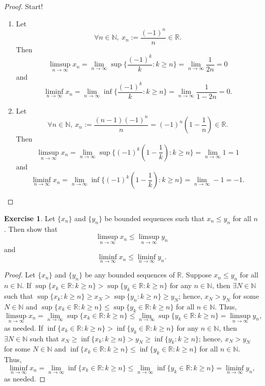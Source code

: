 \documentclass[12pt]{article}
\theoremstyle{definition}
\newtheorem{exercise}{Exercise}
\begin{document}
\begin{proof}
    Start!
    \begin{enumerate}[label=\alph*)]
        \item Let
        \[
            \forall n \in \mathbb{N}, \ x_n := \frac{(-1)^n}{n} \in \mathbb{R}.
        \]
        Then
        \[
            \limsup_{n \to \infty}x_n = \lim_{n \to \infty}\sup\bigg\{\frac{(-1)^k}{k} : k \geq n\bigg\} = \lim_{n \to \infty}\frac{1}{2n} = 0
        \]
        and 
        \[
            \liminf_{n \to \infty}x_n = \lim_{n \to \infty}\inf\bigg\{\frac{(-1)^k}{k} : k \geq n\bigg\} = \lim_{n \to \infty}\frac{1}{1 - 2n} =  0.
        \]
        \item Let
        \[
            \forall n \in \mathbb{N}, \ x_n := \frac{(n - 1)(-1)^n}{n} = (-1)^n\left(1 - \frac{1}{n}\right) \in \mathbb{R}.
        \]
        Then
        \[
            \limsup_{n \to \infty}x_n = \lim_{n \to \infty}\sup\bigg\{(-1)^k\left(1 - \frac{1}{k}\right) : k \geq n\bigg\} = \lim_{n \to \infty} 1 = 1
        \]
        and
        \[
            \liminf_{n \to \infty}x_n = \lim_{n \to \infty}\inf\bigg\{(-1)^k\left(1 - \frac{1}{k}\right) : k \geq n\bigg\} = \lim_{n \to \infty}-1 = -1.
        \]
    \end{enumerate}
\end{proof}

\begin{exercise}
    Let $\{x_n\}$ and $\{y_n\}$ be bounded sequences such that $x_n \leq y_n$ for all $n$. Then show that
    \[
        \limsup_{n \to \infty}x_n \leq \limsup_{n \to \infty}y_n
    \]
    and
    \[
        \liminf_{n \to \infty}x_n \leq \liminf_{n \to \infty}y_n.
    \]
\end{exercise}

\begin{proof}
    Let $\{x_n\}$ and $\{y_n\}$ be any bounded sequences of $\mathbb{R}$. Suppose $x_n \leq y_n$ for all $n \in \mathbb{N}$. If $\sup\{x_k \in \mathbb{R} : k \geq n\} > \sup\{y_k \in \mathbb{R} : k \geq n\}$ for any $n \in \mathbb{N}$, then $\exists N \in \mathbb{N}$ such that $\sup\{x_k : k \geq n\} \geq x_N > \sup\{y_n : k \geq n\} \geq y_N$; hence, $x_N > y_N$ for some $N \in \mathbb{N}$ and $\sup\{x_k \in \mathbb{R} : k \geq n\} \leq \sup\{y_k \in \mathbb{R} : k \geq n\}$ for all $n \in \mathbb{N}$. Thus,
    \[
        \limsup_{n \to \infty}x_n = \lim_{n \to \infty}\sup\{x_k \in \mathbb{R} : k \geq n\} \leq \lim_{n \to \infty}\sup\{y_k \in \mathbb{R}: k \geq n\} = \limsup_{n \to \infty}y_n,
    \]
    as needed. If $\inf\{x_k \in \mathbb{R} : k \geq n\} > \inf\{y_k \in \mathbb{R} : k \geq n\}$ for any $n \in \mathbb{N}$, then $\exists N \in \mathbb{N}$ such that $x_N \geq \inf\{x_k : k \geq n\} > y_N \geq \inf\{y_k : k \geq n\}$; hence, $x_N > y_N$ for some $N \in \mathbb{N}$ and $\inf\{x_k \in \mathbb{R} : k \geq n\} \leq \inf\{y_k \in \mathbb{R} : k \geq n\}$ for all $n \in \mathbb{N}$. Thus,
    \[
        \liminf_{n \to \infty}x_n = \lim_{n \to \infty}\inf\{x_k \in \mathbb{R} : k \geq n\} \leq \lim_{n \to \infty}\inf\{y_k \in \mathbb{R} : k \geq n\} = \liminf_{n \to \infty}y_n,
    \]
    as needed.
\end{proof}
\end{document}
